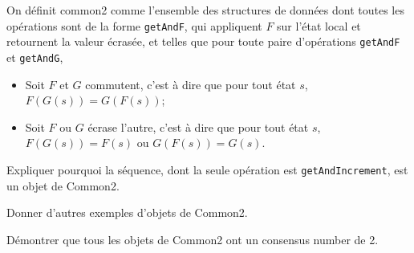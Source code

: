
\begingroup

\begin{exercice}[Common2]
  On définit common2 comme l'ensemble des structures de données
  dont toutes les opérations sont de la forme \lstinline{getAndF},
  qui appliquent $F$ sur l'état local et retournent la valeur écrasée,
  et telles que pour toute paire d'opérations \lstinline{getAndF} et \lstinline{getAndG},
  \begin{itemize}
  \item Soit $F$ et $G$ commutent, c'est à dire que pour tout état $s$, $F(G(s)) = G(F(s))$;
  \item Soit $F$ ou $G$ écrase l'autre, c'est à dire que pour tout état $s$, $F(G(s)) = F(s)$ ou $G(F(s)) = G(s)$.
  \end{itemize}

  \begin{questions}
  \item Expliquer pourquoi la séquence, dont la seule opération est \lstinline{getAndIncrement}, est un objet de Common2. 
  \item Donner d'autres exemples d'objets de Common2. 
  \item Démontrer que tous les objets de Common2 ont un consensus number de 2. 
  \end{questions}
\end{exercice}

\endgroup
\endinput
